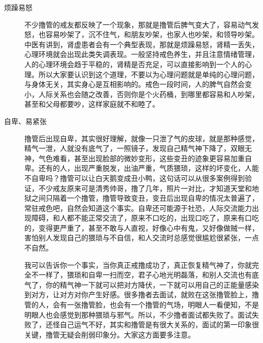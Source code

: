 \documentclass{ctexart}
\begin{document}
\begin{description}
    \item[烦躁易怒] 不少撸管的戒友都反映了一个现象，那就是撸管后脾气变大了，容易动气发怒，也容易吵架了，沉不住气，和朋友吵架，也家人也吵架，和领导吵架。中医有讲到，肾虚患者会有一个典型表现，那就是烦躁易怒，肾精一丢失，心理环境就会出现此类失调表现。一般坚持戒色养生，并且注意情绪管理，人的心理环境会趋于平稳的，肾精是否充足，可以直接影响到一个人的心理。所以大家要认识到这个道理，不要以为心理问题就是单纯的心理问题，与身体无关，其实身心是互相影响的。戒色一段时间，人的脾气自然会变小，人际关系也会随之改善，否则你是个火药桶，到哪里都容易和人吵架，甚至和父母都要吵，这样家庭就不和睦了。
    \item[自卑、易紧张] 撸管后出现自卑，其实很好理解，就像一只泄了气的皮球，就是那种感觉，精气一泄，人就没有底气了，一照镜子，发现自己精气神下降了，双眼无神，气色难看，甚至出现脸部的微妙变形，这些变丑的迹象更容易加重自卑。还有的人，出现严重脱发，出油严重，气质猥琐，这样的坏变化，人能不自卑吗？撸管可以让白天鹅变成丑小鸭，这句话可以从很多案例得到验证，不少戒友原来可是清秀帅哥，撸了几年，照片一对比，才知道天堂和地狱之间只隔着一个撸管，撸管导致变丑，变丑后出现自卑的情况太普遍了，常驻戒色吧，自然会知道这个事实。自卑还可能源于社恐，人际交流能力出现障碍，和人都不能正常交流了，原来不口吃的，出现口吃了，原来有口吃的，变得更严重了，甚至不敢与人直视，好像心中有鬼，又好像做贼一样，害怕别人发现自己的猥琐与不自信，和人交流时总感觉很尴尬很紧张，一点不自然。

    我可以告诉你一个事实，当你真正戒撸成功了，真正恢复精气神了，你就完全不一样了，猥琐和自卑一扫而空，君子心地光明磊落，和别人交流也有底气了，你的精气神一下就可以把对方降伏，一下就可以用自己的正能量感染到对方，让对方对你产生好感。很多撸者去面试，就败在这张撸管脸上，撸管的人，会有一张撸管脸，也会有一个撸管的气场，明眼人一看便知，不是明眼人也会感觉到那种猥琐与邪气。所以，不少撸者面试都失败了。面试失败了，还怪自己运气不好，其实和撸管是有很大关系的，面试的第一印象很关键，撸管无疑会削弱印象分。大家这方面要多注意。


\end{description}
\end{document}
